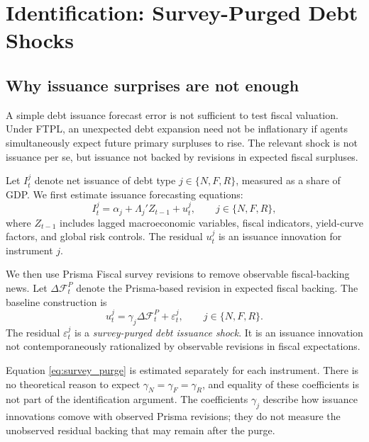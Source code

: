 \documentclass[12pt,a4paper]{article}
\begin{document}
\section{Identification: Survey-Purged Debt Shocks}
\label{sec:identification}

\subsection{Why issuance surprises are not enough}

A simple debt issuance forecast error is not sufficient to test fiscal valuation. Under FTPL, an unexpected debt expansion need not be inflationary if agents simultaneously expect future primary surpluses to rise. The relevant shock is not issuance per se, but issuance not backed by revisions in expected fiscal surpluses.

Let \(I_t^j\) denote net issuance of debt type \(j\in\{N,F,R\}\), measured as a share of GDP. We first estimate issuance forecasting equations:
\begin{equation}
I_t^j
=
\alpha_j
+
\Lambda_j' Z_{t-1}
+u_t^j,
\qquad
j\in\{N,F,R\},
\label{eq:issuance_forecast}
\end{equation}
where \(Z_{t-1}\) includes lagged macroeconomic variables, fiscal indicators, yield-curve factors, and global risk controls. The residual \(u_t^j\) is an issuance innovation for instrument \(j\).

We then use Prisma Fiscal survey revisions to remove observable fiscal-backing news. Let \(\Delta \mathcal{F}_t^{P}\) denote the Prisma-based revision in expected fiscal backing. The baseline construction is
\begin{equation}
u_t^j
=
\gamma_j \Delta \mathcal{F}_t^{P}
+
\varepsilon_t^j,
\qquad
j\in\{N,F,R\}.
\label{eq:survey_purge}
\end{equation}
The residual \(\varepsilon_t^j\) is a \emph{survey-purged debt issuance shock}. It is an issuance innovation not contemporaneously rationalized by observable revisions in fiscal expectations.

Equation \eqref{eq:survey_purge} is estimated separately for each instrument. There is no theoretical reason to expect \(\gamma_N=\gamma_F=\gamma_R\), and equality of these coefficients is not part of the identification argument. The coefficients \(\gamma_j\) describe how issuance innovations comove with observed Prisma revisions; they do not measure the unobserved residual backing that may remain after the purge.
\end{document}
